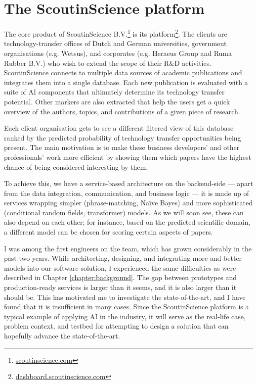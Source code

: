 \chapter{The ScoutinScience platform} \label{chapter:case}

The core product of ScoutinScience B.V.\footnote{\href{https://scoutinscience.com/}{scoutinscience.com}} is its platform\footnote{\href{https://dashboard.scoutinscience.com/}{dashboard.scoutinscience.com}}. The clients are technology-transfer offices of Dutch and German universities, government organisations (e.g. Wetsus), and corporates (e.g. Heraeus Group and Ruma Rubber B.V.) who wish to extend the scope of their R\&D activities. ScoutinScience connects to multiple data sources of academic publications and integrates them into a single database. Each new publication is evaluated with a suite of AI components that ultimately determine its technology transfer potential. Other markers are also extracted that help the users get a quick overview of the authors, topics, and contributions of a given piece of research.

Each client organisation gets to see a different filtered view of this database ranked by the predicted probability of technology transfer opportunities being present. The main motivation is to make these business developers' and other professionals' work more efficient by showing them which papers have the highest chance of being considered interesting by them. 

To achieve this, we have a service-based architecture \cite{kleppmann2017designing} on the backend-side --- apart from the data integration, communication, and business logic --- it is made up of services wrapping simpler (phrase-matching, Naïve Bayes) and more sophisticated (conditional random fields, transformer) models. As we will soon see, these can also depend on each other; for instance, based on the predicted scientific domain, a different model can be chosen for scoring certain aspects of papers.

I was among the first engineers on the team, which has grown considerably in the past two years. While architecting, designing, and integrating more and better models into our software solution, I experienced the same difficulties as were described in Chapter \ref{chapter:background}. The gap between prototypes and production-ready services is larger than it seems, and it is also larger than it should be. This has motivated me to investigate the state-of-the-art, and I have found that it is insufficient in many cases. Since the ScoutinScience platform is a typical example of applying AI in the industry, it will serve as the real-life case, problem context, and testbed for attempting to design a solution that can hopefully advance the state-of-the-art.

